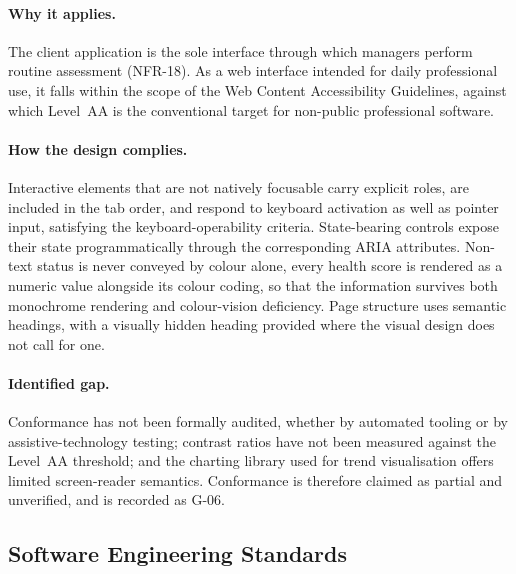 \paragraph{Why it applies.}
The client application is the sole interface through which managers perform
routine assessment (NFR-18). As a web interface intended for daily professional
use, it falls within the scope of the Web Content Accessibility Guidelines,
against which Level~AA is the conventional target for non-public professional
software.

\paragraph{How the design complies.}
Interactive elements that are not natively focusable carry explicit roles, are
included in the tab order, and respond to keyboard activation as well as pointer
input, satisfying the keyboard-operability criteria. State-bearing controls expose
their state programmatically through the corresponding ARIA attributes.
Non-text status is never conveyed by colour alone, every health score is rendered
as a numeric value alongside its colour coding, so that the information survives
both monochrome rendering and colour-vision deficiency. Page structure uses
semantic headings, with a visually hidden heading provided where the visual design
does not call for one.

\paragraph{Identified gap.}
Conformance has not been formally audited, whether by automated tooling or by
assistive-technology testing; contrast ratios have not been measured against the
Level~AA threshold; and the charting library used for trend visualisation offers
limited screen-reader semantics. Conformance is therefore claimed as partial and
unverified, and is recorded as G-06.

\subsection{Software Engineering Standards}
\label{subsec:engineering-standards}

